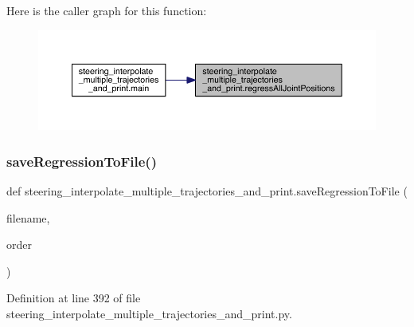Here is the caller graph for this function\+:\nopagebreak
\begin{figure}[H]
\begin{center}
\leavevmode
\includegraphics[width=350pt]{namespacesteering__interpolate__multiple__trajectories__and__print_a455bf7b19b802ee191ffab2ea68b89ff_icgraph}
\end{center}
\end{figure}
\mbox{\label{namespacesteering__interpolate__multiple__trajectories__and__print_abd864bec2616f889e72f950898521b8b}} 
\subsubsection{\texorpdfstring{saveRegressionToFile()}{saveRegressionToFile()}}
{\footnotesize\ttfamily def steering\+\_\+interpolate\+\_\+multiple\+\_\+trajectories\+\_\+and\+\_\+print.\+save\+Regression\+To\+File (\begin{DoxyParamCaption}\item[{}]{filename,  }\item[{}]{order }\end{DoxyParamCaption})}



Definition at line 392 of file steering\+\_\+interpolate\+\_\+multiple\+\_\+trajectories\+\_\+and\+\_\+print.\+py.


